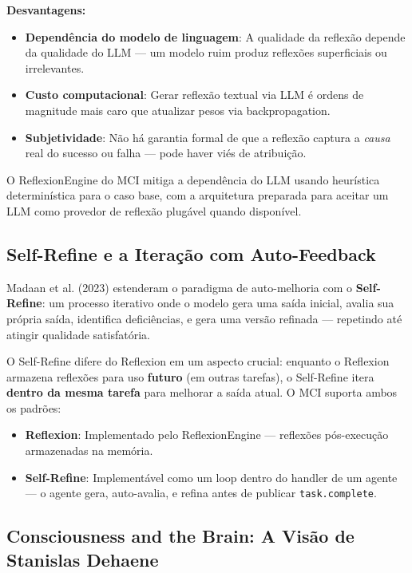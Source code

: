 \textbf{Desvantagens:}
\begin{itemize}
    \item \textbf{Dependência do modelo de linguagem}: A qualidade da reflexão depende da qualidade do LLM — um modelo ruim produz reflexões superficiais ou irrelevantes.
    \item \textbf{Custo computacional}: Gerar reflexão textual via LLM é ordens de magnitude mais caro que atualizar pesos via backpropagation.
    \item \textbf{Subjetividade}: Não há garantia formal de que a reflexão captura a \textit{causa} real do sucesso ou falha — pode haver viés de atribuição.
\end{itemize}

O ReflexionEngine do MCI mitiga a dependência do LLM usando heurística determinística para o caso base, com a arquitetura preparada para aceitar um LLM como provedor de reflexão plugável quando disponível.

\subsection{Self-Refine e a Iteração com Auto-Feedback}

Madaan et al. (2023) \cite{Madaan2023_SelfRefine} estenderam o paradigma de auto-melhoria com o \textbf{Self-Refine}: um processo iterativo onde o modelo gera uma saída inicial, avalia sua própria saída, identifica deficiências, e gera uma versão refinada — repetindo até atingir qualidade satisfatória.

O Self-Refine difere do Reflexion em um aspecto crucial: enquanto o Reflexion armazena reflexões para uso \textbf{futuro} (em outras tarefas), o Self-Refine itera \textbf{dentro da mesma tarefa} para melhorar a saída atual. O MCI suporta ambos os padrões:

\begin{itemize}
    \item \textbf{Reflexion}: Implementado pelo ReflexionEngine — reflexões pós-execução armazenadas na memória.
    \item \textbf{Self-Refine}: Implementável como um loop dentro do handler de um agente — o agente gera, auto-avalia, e refina antes de publicar \texttt{task.complete}.
\end{itemize}

\subsection{Consciousness and the Brain: A Visão de Stanislas Dehaene}


